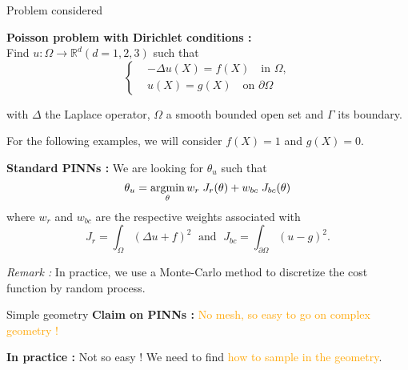 \begin{frame}{Problem considered}
	\vspace{5pt}
    \begin{minipage}{0.7\linewidth}
    	\textbf{Poisson problem with Dirichlet conditions :} \\
    	Find $u : \Omega \rightarrow \mathbb{R}^d (d=1,2,3)$ such that
    	\vspace{-10pt}
    	\begin{equation*}
    		\left\{\begin{aligned}
    			&-\Delta u(X) = f(X) \quad \text{in } \Omega, \\
    			&u(X) = g(X) \quad \text{on } \partial \Omega
    		\end{aligned}\right. \label{edp}
    	\end{equation*}
    \end{minipage}
	\begin{minipage}{0.26\linewidth}
		\vspace{-20pt}
	\end{minipage}
	
	with $\Delta$ the Laplace operator, $\Omega$ a smooth bounded open set and $\Gamma$ its boundary. 
	
	For the following examples, we will consider $f(X)=1$ and $g(X)=0$.
	
	\vspace{5pt}
	
	\textbf{Standard PINNs :} We are looking for $\theta_u$ such that
	\begin{equation*}
		\theta_u = \operatorname*{argmin}_{\theta} w_{r}\; J_{r}(\theta)+w_{bc}\; J_{bc}(\theta)
	\end{equation*}
	where $w_{r}$ and $w_{bc}$ are the respective weights associated with
	\begin{equation*}
		J_{r} = \int_\Omega (\Delta u+f)^2 \; \text{ and } \; J_{bc} = \int_{\partial\Omega} (u-g)^2.
	\end{equation*}	
	
	\footnotesize
	\textit{Remark :} In practice, we use a Monte-Carlo method to discretize the cost function by random process.
\end{frame}

\begin{frame}{Simple geometry}
	\textbf{Claim on PINNs :} \textcolor{orange}{No mesh, so easy to go on complex geometry !}
	
	\centering
	
	\flushleft
	\textbf{In practice :} Not so easy ! We need to find \textcolor{orange}{how to sample in the geometry}.
\end{frame}

